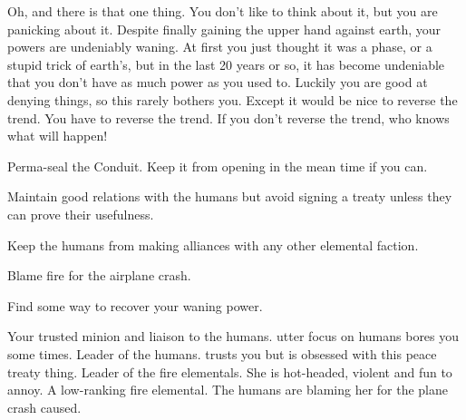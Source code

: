 \documentclass[char]{elementals}
\begin{document}
Oh, and there is that one thing. You don't like to think about it, but you are panicking about it. Despite finally gaining the upper hand against earth, your powers are undeniably waning. At first you just thought it was a phase, or a stupid trick of earth's, but in the last 20 years or so, it has become undeniable that you don't have as much power as you used to. Luckily you are good at denying things, so this rarely bothers you. Except it would be nice to reverse the trend. You have to reverse the trend. If you don't reverse the trend, who knows what will happen!

\begin{itemz}[Goals]
	\item  Perma-seal the Conduit. Keep it from opening in the mean time if you can.
	\item  Maintain good relations with the humans but avoid signing a treaty unless they can prove their usefulness.
	\item  Keep the humans from making alliances with any other elemental faction.
	\item  Blame fire for the airplane crash.
	\item  Find some way to recover your waning power.
\end{itemz}

\begin{contacts}
	\contact{\cNaturalist{\intro}} Your trusted minion and liaison to the humans. \cNaturalist{\Their} utter focus on humans bores you some times.
	\contact{\cLeader{\intro}} Leader of the humans. \cLeader{\They} trusts you but is obsessed with this peace treaty thing.
	\contact{\cQueen{\intro}} Leader of the fire elementals. She is hot-headed, violent and fun to annoy.
  \contact{\cJuliet{\intro}} A low-ranking fire elemental. The humans are blaming her for the plane crash \cNaturalist{} caused.
\end{contacts} 
\end{document}
